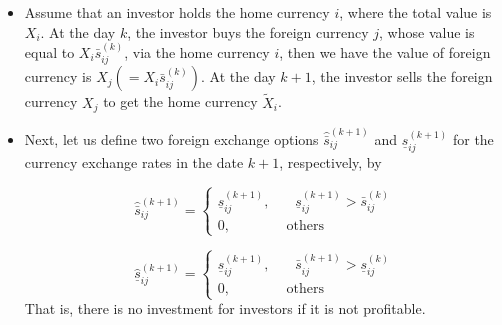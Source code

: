 \documentclass[11pt]{article}
\numberwithin{equation}{section}
\begin{document}
\begin{itemize}
	\item Assume that an investor holds the home currency $i$, where the total value is $X_{i}$. At the day $k$, the investor buys the foreign currency $j$, whose value is equal to $X_{i}\bar s_{ij}^{(k)}$, via the home currency $i$, then we have the value of foreign currency is $X_{j}(=X_{i}\bar s_{ij}^{(k)})$. At the day $k+1$, the investor sells the foreign currency $X_{j}$ to get the home currency $\tilde X_{i}$.
	
	\item Next, let us define two foreign exchange options $\hat{\bar s}_{ij}^{(k+1)}$ and $\hat{\underline s}_{ij}^{(k+1)}$  for the currency exchange rates in the date $k+1$, respectively,  by 
	
\begin{equation}\label{ce1}
\hat{\bar s}_{ij}^{(k+1)}=
\begin{cases}
\underline s_{ij}^{(k+1)} , ~~~~~~~~\underline s_{ij}^{(k+1)}>\bar s_{ij}^{(k)}\\
0 , ~~~~~~~~~~~~~~~~~~\mbox{others}
\end{cases}
\end{equation}

\begin{equation}\label{ce2}
\hat{\underline s}_{ij}^{(k+1)}=
\begin{cases}
\underline s_{ij}^{(k+1)} , ~~~~~~~~\bar s_{ij}^{(k+1)}>\underline s_{ij}^{(k)}\\
0 , ~~~~~~~~~~~~~~~~~~\mbox{others}
\end{cases}
\end{equation}
That is, there is no investment for investors if it is not profitable. 



\end{itemize}
\end{document}
